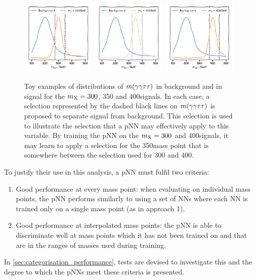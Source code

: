 \begin{figure}
    \centering
    \includegraphics[width=0.32\textwidth]{Figures/Dihiggs/categorisation/pNN_intution_mX300.pdf}
    \includegraphics[width=0.32\textwidth]{Figures/Dihiggs/categorisation/pNN_intution_mX350.pdf}
    \includegraphics[width=0.32\textwidth]{Figures/Dihiggs/categorisation/pNN_intution_mX400.pdf}
    \caption[Illustration of pNN Interpolation Ability]{Toy examples of distributions of $m(\gamma\gamma\tau\tau)$ in background and in signal for the $m_{\mathrm{X}}=300$, 350 and 400\GeV \XHH signals. In each case, a selection represented by the dashed black lines on $m(\gamma\gamma\tau\tau)$ is proposed to separate signal from background. This selection is used to illustrate the selection that a pNN may effectively apply to this variable. By training the pNN on the $m_{\mathrm{X}}=300$ and 400\GeV signals, it may learn to apply a selection for the 350\GeV mass point that is somewhere between the selection used for 300 and 400\GeV.}\label{fig:pNN_interpolation_intution}
\end{figure}

\newpage\noindent
To justify their use in this analysis, a pNN must fulfil two criteria:
\begin{enumerate}
    \item Good performance at every mass point: when evaluating on individual mass points, the pNN performs similarly to using a set of NNs where each NN is trained only on a single mass point (as in approach 1),
    \item Good performance at interpolated mass points: the pNN is able to discriminate well at mass points which it has not been trained on and that are in the ranges of masses used during training.
\end{enumerate}
In \cref{sec:categorisation_performance}, tests are devised to investigate this and the degree to which the pNNs meet these criteria is presented.

